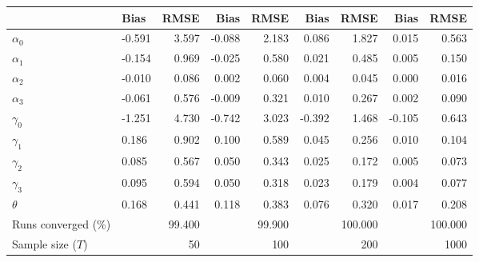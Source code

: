 
\begin{tabular}[t]{llrrrrrrr}
\toprule
  & Bias & RMSE & Bias & RMSE & Bias & RMSE & Bias & RMSE\\
\midrule
$\alpha_{0}$ & -0.591 & 3.597 & -0.088 & 2.183 & 0.086 & 1.827 & 0.015 & 0.563\\
$\alpha_{1}$ & -0.154 & 0.969 & -0.025 & 0.580 & 0.021 & 0.485 & 0.005 & 0.150\\
$\alpha_{2}$ & -0.010 & 0.086 & 0.002 & 0.060 & 0.004 & 0.045 & 0.000 & 0.016\\
$\alpha_{3}$ & -0.061 & 0.576 & -0.009 & 0.321 & 0.010 & 0.267 & 0.002 & 0.090\\
$\gamma_{0}$ & -1.251 & 4.730 & -0.742 & 3.023 & -0.392 & 1.468 & -0.105 & 0.643\\
$\gamma_{1}$ & 0.186 & 0.902 & 0.100 & 0.589 & 0.045 & 0.256 & 0.010 & 0.104\\
$\gamma_{2}$ & 0.085 & 0.567 & 0.050 & 0.343 & 0.025 & 0.172 & 0.005 & 0.073\\
$\gamma_{3}$ & 0.095 & 0.594 & 0.050 & 0.318 & 0.023 & 0.179 & 0.004 & 0.077\\
$\theta$ & 0.168 & 0.441 & 0.118 & 0.383 & 0.076 & 0.320 & 0.017 & 0.208\\
Runs converged (\%) &  & 99.400 &  & 99.900 &  & 100.000 &  & 100.000\\
Sample size ($T$) &  & 50 &  & 100 &  & 200 &  & 1000\\
\bottomrule
\end{tabular}
